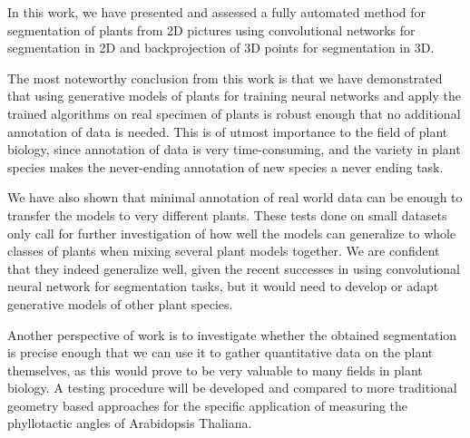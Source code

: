 In this work, we have presented and assessed a fully automated method for segmentation of
plants from 2D pictures using convolutional networks for segmentation in 2D and
backprojection of 3D points for segmentation in 3D.

The most noteworthy conclusion from this work is that we have demonstrated that using generative
models of plants for training neural networks and apply the trained algorithms
on real specimen of plants is robust enough that no additional annotation of
data is needed. This is of utmost importance to the field of plant biology, since annotation of data
is very time-consuming, and the variety in plant species makes
the never-ending annotation of new species a never ending task.

We have also shown that minimal annotation of real world data can be enough to
transfer the models to very different plants. These tests done on small datasets
only call for further investigation of how well the models can generalize to whole
classes of plants when mixing several plant models together. We are confident
that they indeed generalize well, given the recent successes in using
convolutional neural network for segmentation tasks, but it would need to
develop or adapt generative models of other plant species.

Another perspective of work is to investigate whether the obtained segmentation is precise
enough that we can use it to gather quantitative data on the plant themselves,
as this would prove to be very valuable to many fields in plant biology. A
testing procedure will be developed and compared to more traditional geometry
based approaches for the specific application of measuring the phyllotactic
angles of Arabidopsis Thaliana.
